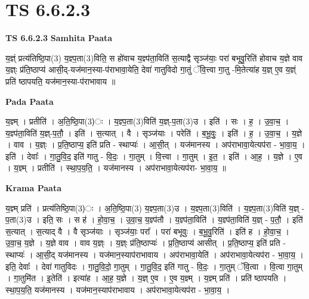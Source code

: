 \documentclass[17pt]{extarticle}
\begin{document}
\section{ TS 6.6.2.3 }

\textbf{TS 6.6.2.3 } \newline
\textbf{Samhita Paata} \newline

य॒ज्ञ्ं प्रत्य॑तिष्ठि॒पा(3) य॒ज्ञ्प॒ता(3)विति॒ स हो॑वाच य॒ज्ञ्प॑ता॒विति॑ स॒त्याद्वै सृञ्ज॑याः॒ परा॑ बभूवु॒रिति॑ होवाच य॒ज्ञे वाव य॒ज्ञ्ः प्र॑ति॒ष्ठाप्य॑ आसी॒द्-यज॑मान॒स्या-प॑राभावा॒येति॒ देवा॑ गातुविदो गा॒तुं ॅवि॒त्त्वा गा॒तु -मि॒तेत्या॑ह य॒ज्ञ् ए॒व य॒ज्ञ्ं प्रति॑ ष्ठापयति॒ यज॑मान॒स्या-प॑राभावाय ॥ \newline

\textbf{Pada Paata} \newline

य॒ज्ञ्म् । प्रतीति॑ । अ॒ति॒ष्ठि॒पा(3)ः । य॒ज्ञ्प॒ता(3)विति॑ य॒ज्ञ्-प॒ता(3)उ । इति॑ । सः । ह॒ । उ॒वा॒च॒ । य॒ज्ञ्प॑ता॒विति॑ य॒ज्ञ्-प॒तौ॒ । इति॑ । स॒त्यात् । वै । सृञ्ज॑याः । परेति॑ । ब॒भू॒वुः॒ । इति॑ । ह॒ । उ॒वा॒च॒ । य॒ज्ञे । वाव । य॒ज्ञ्ः । प्र॒ति॒ष्ठाप्य॒ इति॑ प्रति - स्थाप्यः॑ । आ॒सी॒त् । यज॑मानस्य । अप॑राभावा॒येत्यप॑रा - भा॒वा॒य॒ । इति॑ । देवाः᳚ । गा॒तु॒वि॒द॒ इति॑ गातु - वि॒दः॒ । गा॒तुम् । वि॒त्त्वा । गा॒तुम् । इ॒त॒ । इति॑ । आ॒ह॒ । य॒ज्ञे । ए॒व । य॒ज्ञ्म् । प्रतीति॑ । स्था॒प॒य॒ति॒ । यज॑मानस्य । अप॑राभावा॒येत्यप॑रा- भा॒वा॒य॒ ॥  \newline


\textbf{Krama Paata} \newline

य॒ज्ञ्म् प्रति॑ । प्रत्य॑तिष्ठि॒पा(3)ः । अ॒ति॒ष्ठि॒पा(3) य॒ज्ञ्प॒ता(3)उ । य॒ज्ञ्प॒ता(3)विति॑ । य॒ज्ञ्प॒ता(3)विति॑ य॒ज्ञ् - प॒ता(3)उ । इति॒ सः । स ह॑ । हो॒वा॒च॒ । उ॒वा॒च॒ य॒ज्ञ्प॑तौ । य॒ज्ञ्प॑ता॒विति॑ । य॒ज्ञ्प॑ता॒विति॑ य॒ज्ञ् - प॒तौ॒ । इति॑ स॒त्यात् । स॒त्याद् वै । वै सृञ्ज॑याः । सृञ्ज॑याः॒ परा᳚ । परा॑ बभूवुः । ब॒भू॒वु॒रिति॑ । इति॑ ह । हो॒वा॒च॒ । उ॒वा॒च॒ य॒ज्ञे । य॒ज्ञे वाव । वाव य॒ज्ञ्ः । य॒ज्ञ्ः प्र॑ति॒ष्ठाप्यः॑ । प्र॒ति॒ष्ठाप्य॑ आसीत् । प्र॒ति॒ष्ठाप्य॒ इति॑ प्रति - स्थाप्यः॑ । आ॒सी॒द् यज॑मानस्य । यज॑मान॒स्याप॑राभावाय । अप॑राभावा॒येति॑ । अप॑राभावा॒येत्यप॑रा - भा॒वा॒य॒ । इति॒ देवाः᳚ । देवा॑ गातुविदः । गा॒तु॒वि॒दो॒ गा॒तुम् । गा॒तु॒वि॒द॒ इति॑ गातु - वि॒दः॒ । गा॒तुम् ॅवि॒त्वा । वि॒त्वा गा॒तुम् । गा॒तुमि॑त । इ॒तेति॑ । इत्या॑ह । आ॒ह॒ य॒ज्ञे । य॒ज्ञ् ए॒व । ए॒व य॒ज्ञ्म् । य॒ज्ञ्म् प्रति॑ । प्रति॑ ष्ठापयति । स्था॒प॒य॒ति॒ यज॑मानस्य । यज॑मान॒स्याप॑राभावाय । अप॑राभावा॒येत्यप॑रा - भा॒वा॒य॒ । \newline
\end{document}
